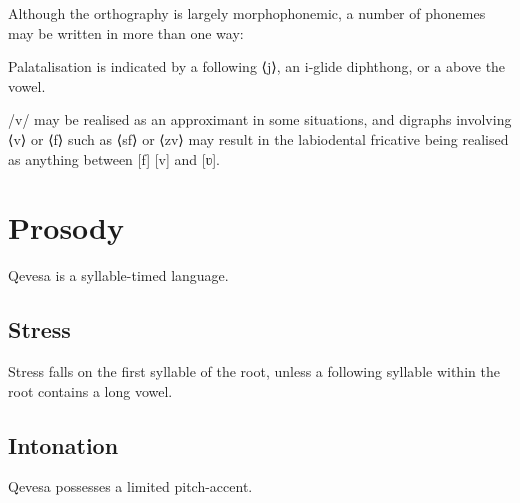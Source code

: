\documentclass[grammar]{subfiles}
\begin{document}
  Although the orthography is largely morphophonemic, a number of phonemes may be written in more than one way:

  \begin{itemize*}
    \item Palatalisation is indicated by a following ⟨j⟩, an i-glide diphthong, or a  above the vowel. %
    \item /v/ may be realised as an approximant in some situations, and digraphs involving ⟨v⟩ or ⟨f⟩ such as ⟨sf⟩ or ⟨zv⟩ may result in the labiodental fricative being realised as anything between [f] [v] and [ʋ].
  \end{itemize*}

  \section{Prosody}
  \label{sec:prosody}

  Qevesa is a syllable-timed language.
  \ToBeWritten

  \subsection{Stress}
  \label{ssec:stress}

  Stress falls on the first syllable of the root, unless a following syllable within the root contains a long vowel. \ToBeWritten

  \subsection{Intonation}
  \label{ssec:intonation}

  Qevesa possesses a limited pitch-accent.
  \ToBeWritten
\end{document}
